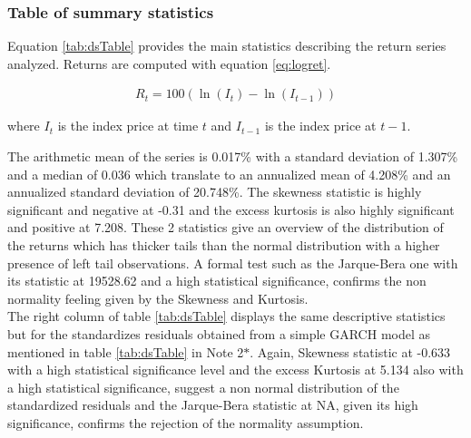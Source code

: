 \documentclass[a4paper, twoside]{templates/ociamthesis}
\begin{document}
\hypertarget{table-of-summary-statistics}{%
\subsubsection{Table of summary statistics}\label{table-of-summary-statistics}}

Equation \ref{tab:dsTable} provides the main statistics describing the return series analyzed. Returns are computed with equation \eqref{eq:logret}.

\begin{align}
R_{t}=100\left(\ln \left(I_{t}\right)-\ln \left(I_{t-1}\right)\right)
  \label{eq:logret}
\end{align}

\noindent where \(I_{t}\) is the index price at time \(t\) and \(I_{t-1}\) is the index price at \(t-1\).

\noindent The arithmetic mean of the series is 0.017\% with a standard deviation of 1.307\% and a median of 0.036 which translate to an annualized mean of 4.208\% and an annualized standard deviation of 20.748\%. The skewness statistic is highly significant and negative at -0.31 and the excess kurtosis is also highly significant and positive at 7.208. These 2 statistics give an overview of the distribution of the returns which has thicker tails than the normal distribution with a higher presence of left tail observations. A formal test such as the Jarque-Bera one with its statistic at 19528.62 and a high statistical significance, confirms the non normality feeling given by the Skewness and Kurtosis. ~\\

\noindent The right column of table \ref{tab:dsTable} displays the same descriptive statistics but for the standardizes residuals obtained from a simple GARCH model as mentioned in table \ref{tab:dsTable} in Note 2\(*\). Again, Skewness statistic at -0.633 with a high statistical significance level and the excess Kurtosis at 5.134 also with a high statistical significance, suggest a non normal distribution of the standardized residuals and the Jarque-Bera statistic at NA, given its high significance, confirms the rejection of the normality assumption.
\end{document}
